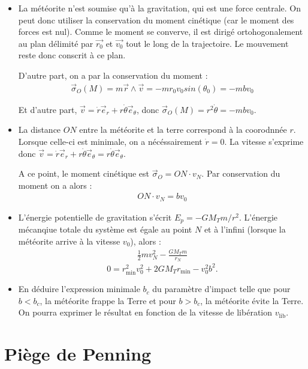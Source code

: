 \documentclass{report}
\begin{document}
\begin{itemize}
\item La météorite n'est soumise qu'à la gravitation, qui est une force centrale. On peut donc utiliser la conservation du moment cinétique (car le moment des forces est nul). Comme le moment se converve, il est dirigé ortohogonalement au plan délimité par $\vec{r_0}$ et $\vec{v_0}$ tout le long de la trajectoire. Le mouvement reste donc conscrit à ce plan.

D'autre part, on a par la conservation du moment :
\begin{align*}
	\vec{\sigma}_O(M)=m\vec{r}\wedge\vec{v}=-mr_0v_0sin(\theta_0)=-mbv_0
\end{align*}

Et d'autre part, $\vec{v}=\dot{r}\vec{e}_r+r\dot{\theta}\vec{e}_\theta$, donc $\vec{\sigma}_O(M)=r^2\dot{\theta}=-mbv_0$.


\item La distance $ON$ entre la météorite et la terre correspond à la coorodnnée $r$. Lorsque celle-ci est minimale, on a nécéssairement $\dot{r}=0$. La vitesse s'exprime donc $\vec{v}=\dot{r}\vec{e}_r+r\dot{\theta}\vec{e}_\theta=r\dot{\theta}\vec{e}_\theta$.

A ce point, le moment cinétique est $\vec{\sigma}_O=ON\cdot v_N$. Par conservation du moment on a alors :
\begin{align*}
	ON\cdot v_N=bv_0
\end{align*}

\item L'énergie potentielle de gravitation s'écrit $E_p=-GM_Tm/r^2$. L'énergie mécanqiue totale du système est égale au point $N$ et à l'infini (lorsque la météorite arrive à la vitesse $v_0$), alors :
\begin{align*}
	\frac{1}{2}mv_N^2-\frac{GM_Tm}{r_N}
\end{align*}
$$
0=r^2_\mathrm{min}v_0^2+2GM_Tr_\mathrm{min}-v_0^2b^2.
$$
\item En déduire l'expression minimale $b_c$ du paramètre d'impact telle que pour $b<b_c$, la météorite frappe la Terre et pour $b>b_c$, la météorite évite la Terre. On pourra exprimer le résultat en fonction de la vitesse de libération $v_\mathrm{lib}$.
\end{itemize}

\section*{Piège de Penning}
\end{document}
